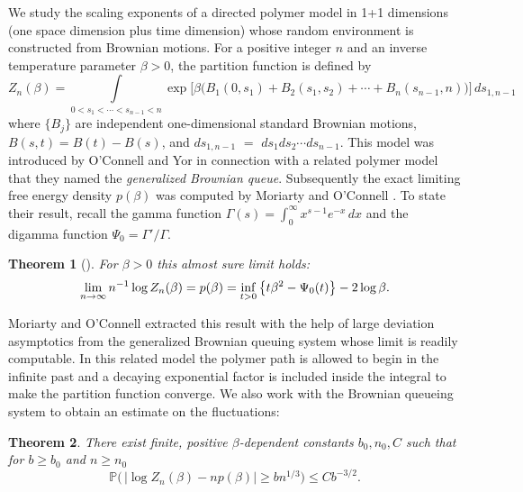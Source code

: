 \documentclass[11pt]{amsart}
\newtheorem{theorem}{\sc Theorem}[section]
\numberwithin{equation}{section}
\theoremstyle{remark}
\providecommand{\abs}[1]{\vert#1\vert}
\begin{document}
We study the scaling exponents of a directed polymer model in 1+1  
  dimensions (one space dimension plus  time dimension)
   whose random environment is constructed from
Brownian motions.   For a positive integer $n$ and an inverse 
temperature  parameter $\beta>0$, 
the partition function is defined by 
\begin{equation}
{{Z}}_n(\beta)=   
\int\limits_{0<s_{1}<\dotsm<s_{n-1}<n}  \exp\bigl[ \beta\bigl(B_1(0,s_1) +B_{2}(s_1,s_{2})
+\dotsm + B_n(s_{n-1},n)\bigr)\bigr] \,ds_{1,n-1} 
\label{zetadef1}\end{equation}
where $\{B_j\}$ are independent one-dimensional standard Brownian motions,
$B(s,t)=B(t)-B(s)$, and 
$ds_{1,n-1}$ $=$ $ds_1ds_2 \dotsm ds_{n-1}$.  
This model was   introduced
 by O'Connell and  Yor   \cite{oconn-yor-01} in connection with a related polymer model
 that they named  the  
{\sl generalized Brownian queue}.  Subsequently the exact limiting free energy density
${p(\beta)}$ was computed by
Moriarty and O'Connell \cite{mori-oconn-07}. To state their result, recall the  
  gamma function   $\Gamma(s)=\int_0^\infty x^{s-1}e^{-x}\,dx$ and the digamma 
function   ${\Psi_0}=\Gamma'/\Gamma$.

\begin{theorem} [\cite{mori-oconn-07}]    For $\beta>0$ this almost sure limit holds:  
\begin{equation} \lim_{n\to\infty} n^{-1}\log {{Z}}_n(\beta)=  {p(\beta)}=
\inf_{t>0}\left\{t \beta^2-{\Psi_0}(t)  \right\}-2\log\beta.  
{\nonumber} \end{equation}
 \label{zeta1thm}
  \end{theorem}

Moriarty and O'Connell extracted this result with the help of large deviation asymptotics  from 
{the generalized Brownian queuing system} whose limit is readily computable.  
In this related model  the polymer path is allowed to begin in the
infinite past and a decaying exponential factor is included inside the integral
to make  the partition function converge.  We also work with the Brownian queueing system
  to obtain  an estimate on the fluctuations:
 
\begin{theorem} There exist finite, positive  $\beta$-dependent constants
$b_0, n_0, C$ such that for  $b\ge b_0$ and $n\ge n_0$ 
\[  {\mathbb{P}}\bigl( \,\abs{\log {{Z}}_n(\beta) -n {p(\beta)}}\ge bn^{1/3} \bigr)
\le Cb^{-3/2}.  \]
\label{zeta2thm}\end{theorem} 
\end{document}
